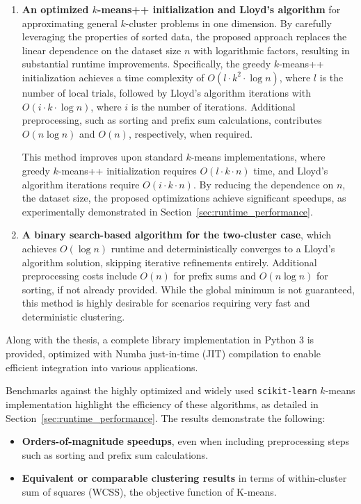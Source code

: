 \begin{enumerate}[leftmargin=*]
\item \textbf{An optimized $k$-means++ initialization and Lloyd’s algorithm} for approximating general \(k\)-cluster problems in one dimension. By carefully leveraging the properties of sorted data, the proposed approach replaces the linear dependence on the dataset size \(n\) with logarithmic factors, resulting in substantial runtime improvements. Specifically, the greedy $k$-means++ initialization achieves a time complexity of \(O(l \cdot k^2 \cdot \log n)\), where \(l\) is the number of local trials, followed by Lloyd’s algorithm iterations with \(O(i \cdot k \cdot \log n)\), where $i$ is the number of iterations. Additional preprocessing, such as sorting and prefix sum calculations, contributes \(O(n \log n)\) and \(O(n)\), respectively, when required.

This method improves upon standard $k$-means implementations, where greedy $k$-means++ initialization requires \(O(l \cdot k \cdot n)\) time, and Lloyd's algorithm iterations require \(O(i \cdot k \cdot n)\). By reducing the dependence on \(n\), the dataset size, the proposed optimizations achieve significant speedups, as experimentally demonstrated in Section~\ref{sec:runtime_performance}.

\item \textbf{A binary search-based algorithm for the two-cluster case}, which achieves \(O(\log n)\) runtime and deterministically converges to a Lloyd’s algorithm solution, skipping iterative refinements entirely. Additional preprocessing costs include \(O(n)\) for prefix sums and \(O(n \log n)\) for sorting, if not already provided. While the global minimum is not guaranteed, this method is highly desirable for scenarios requiring very fast and deterministic clustering.
\end{enumerate}


Along with the thesis, a complete library implementation in Python 3 is provided, optimized with Numba just-in-time (JIT) compilation \cite{numba} to enable efficient integration into various applications.

Benchmarks against the highly optimized and widely used \texttt{scikit-learn} $k$-means implementation \cite{sklearn} highlight the efficiency of these algorithms, as detailed in Section~\ref{sec:runtime_performance}. The results demonstrate the following:

\begin{itemize}[leftmargin=*]
    \item \textbf{Orders-of-magnitude speedups}, even when including preprocessing steps such as sorting and prefix sum calculations.
    \item \textbf{Equivalent or comparable clustering results} in terms of within-cluster sum of squares (WCSS), the objective function of K-means.
\end{itemize}

